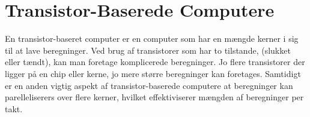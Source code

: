 \section{Transistor-Baserede Computere}
En transistor-baseret computer er en computer som har en mængde kerner i 
sig til at lave beregninger. Ved brug af transistorer som har to tilstande, 
(slukket eller tændt), kan man foretage komplicerede beregninger. Jo 
flere transistorer der ligger på en chip eller kerne, jo mere større 
beregninger kan foretages. Samtidigt er en anden vigtig aspekt af 
transistor-baserede computere at beregninger kan parelleliserers over 
flere kerner, hvilket effektiviserer mængden af beregninger per 
takt.
